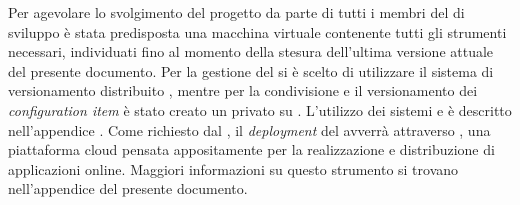 			Per agevolare lo svolgimento del progetto da parte di tutti i membri del  di sviluppo è stata predisposta una macchina virtuale contenente tutti gli strumenti  necessari, individuati fino al momento della stesura dell'ultima versione attuale del presente documento.
				Per la gestione del  si è scelto di utilizzare il sistema di versionamento distribuito , mentre per la condivisione e il versionamento dei \textit{configuration item} è stato creato un  privato su .
				L'utilizzo dei sistemi  e  è descritto nell'appendice .
				Come richiesto dal , il \textit{deployment} del  avverrà attraverso , una piattaforma cloud pensata appositamente per la realizzazione e distribuzione di applicazioni online. Maggiori informazioni su questo strumento si trovano nell'appendice  del presente documento.
			
